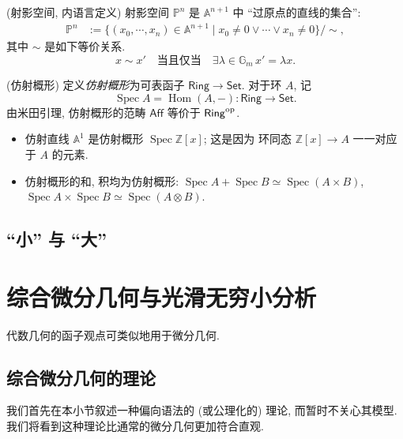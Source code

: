 
\begin{definition}
	{(射影空间, 内语言定义)}
	射影空间 $\mathbb P^n$ 是 $\mathbb A^{n+1}$ 中 ``过原点的直线的集合'':
	$$
	\begin{aligned}
		\mathbb P^n&:=
		\{(x_0,\cdots,x_n)\in \mathbb A^{n+1}\mid
		x_0\neq 0\lor\cdots\lor x_n\neq 0\}\big/ \sim,
	\end{aligned}
	$$
	其中 $\sim$ 是如下等价关系.
	$$
	x\sim x'\quad\text{当且仅当}\quad \exists \lambda \in \mathbb G_m\,x'=\lambda x.
	$$
\end{definition}

\begin{definition}
	{(仿射概形)}
	定义\emph{仿射概形}为可表函子 $\mathsf {Ring}\to\mathsf {Set}$. 对于环 $A$, 记
	$$
	\operatorname{Spec}A = \operatorname{Hom}(A,-)\colon \mathsf {Ring}\to \mathsf {Set}.
	$$
	由米田引理, 仿射概形的范畴 $\mathsf {Aff}$ 等价于 $\mathsf {Ring}^{\text{op}}$.
\end{definition}
\begin{example}
	{}
	\begin{itemize}
		\item 仿射直线 $\mathbb A^1$ 是仿射概形 $\operatorname{Spec}\mathbb{Z}[x]$; 这是因为 环同态 $\mathbb{Z}[x]\to A$ 一一对应于 $A$ 的元素.
		\item 仿射概形的和, 积均为仿射概形: $\operatorname{Spec}A+\operatorname{Spec}B\simeq \operatorname{Spec}(A\times B)$, $\operatorname{Spec}A\times\operatorname{Spec}B\simeq\operatorname{Spec}(A\otimes B)$.
	\end{itemize}
\end{example}

\subsection{``小'' \topos{}与 ``大'' \topos{}}




\section{综合微分几何与光滑无穷小分析}

代数几何的函子观点可类似地用于微分几何.

\subsection{综合微分几何的理论}

我们首先在本小节叙述一种偏向语法的 (或公理化的) 理论, 而暂时不关心其模型. 我们将看到这种理论比通常的微分几何更加符合直观.

